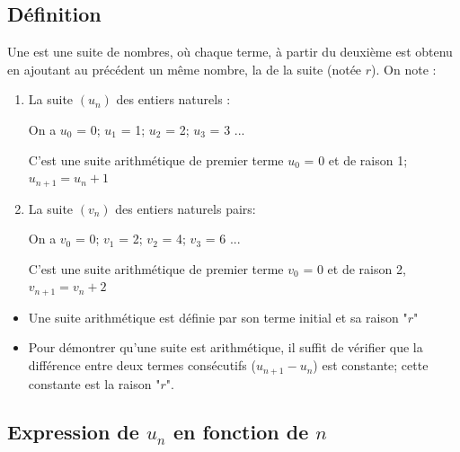 \documentclass[12pt,a4paper]{article}
\begin{document}
\subsection{Définition}



\begin{mybilan}

Une  est une suite de nombres, où chaque terme, à partir du deuxième est obtenu en ajoutant au précédent un même nombre, la  de la suite (notée $r$).	
		On note :
			
\end{mybilan}

\begin{myex}
	\begin{enumerate}
		\item La suite $(u_n)$ des entiers naturels : 
		
		On a $u_0$ = 0; $u_1$ = 1; $u_2$ = 2; $u_3$ = 3 ...
		
		C'est une suite arithmétique de premier terme $u_0$ = 0 et de raison 1; \\ $u_{n+1} = u_n + 1 $
		
		\item La suite $(v_n)$ des entiers naturels pairs: 
		
		On a $v_0$ = 0; $v_1$ = 2; $v_2$ = 4; $v_3$ = 6 ...
		
		C'est une suite arithmétique de premier terme $v_0$ = 0 et de raison 2,\\ $v_{n+1} = v_n + 2 $
	\end{enumerate}
\end{myex}


\begin{myrem}
	\begin{itemize}
		\item Une suite arithmétique est définie par son terme initial et sa raison "$r$"
		
		\item Pour démontrer qu'une suite est arithmétique, il suffit de vérifier que la différence entre deux termes consécutifs ($u_{n+1}-u_n$) est constante; cette constante est la raison "$r$".
	\end{itemize}
\end{myrem}

\subsection{Expression de $u_n$ en fonction de $n$}
\end{document}
